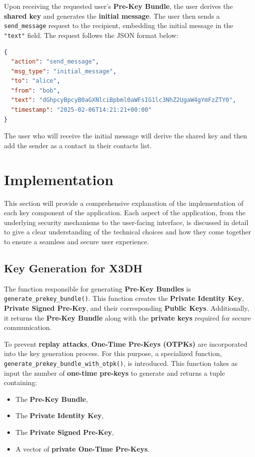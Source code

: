 
Upon receiving the requested user's \textbf{Pre-Key Bundle}, the user derives the \textbf{shared key} and generates the \textbf{initial message}. The user then sends a \texttt{send\_message} request to the recipient, embedding the initial message in the \texttt{"text"} field. The request follows the JSON format below:

\begin{lstlisting}[language=json, caption={Initial Message Request Format}]
{
  "action": "send_message",
  "msg_type": "initial_message",
  "to": "alice",
  "from": "bob",
  "text": "dGhpcyBpcyB0aGXNlciBpbml0aWFsIG1lc3NhZ2UgaW4gYmFzZTY0",
  "timestamp": "2025-02-06T14:21:21+00:00"
}
\end{lstlisting}

The user who will receive the initial message will derive the shared key and then add the sender as a contact in their contacts list.

\section{Implementation}
\label{sec:Implementation}

This section will provide a comprehensive explanation of the implementation of each key component of the application. Each aspect of the application, from the underlying security mechanisms to the user-facing interface, is discussed in detail to give a clear understanding of the technical choices and how they come together to ensure a seamless and secure user experience.

\subsection{Key Generation for X3DH}
\label{subsec:KeyGeneration}

The function responsible for generating \textbf{Pre-Key Bundles} is \texttt{generate\_prekey\_bundle()}. This function creates the \textbf{Private Identity Key}, \textbf{Private Signed Pre-Key}, and their corresponding \textbf{Public Keys}. Additionally, it returns the \textbf{Pre-Key Bundle} along with the \textbf{private keys} required for secure communication.

To prevent \textbf{replay attacks}, \textbf{One-Time Pre-Keys (OTPKs)} are incorporated into the key generation process. For this purpose, a specialized function, \\ \texttt{generate\_prekey\_bundle\_with\_otpk()}, is introduced. This function takes as input the number of \textbf{one-time pre-keys} to generate and returns a tuple containing:
\begin{itemize}
    \item The \textbf{Pre-Key Bundle},
    \item The \textbf{Private Identity Key},
    \item The \textbf{Private Signed Pre-Key},
    \item A vector of \textbf{private One-Time Pre-Keys}.
\end{itemize}

